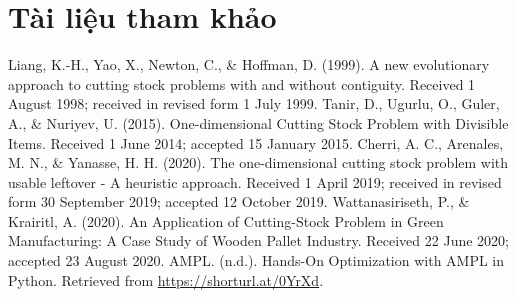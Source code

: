 \documentclass[a4paper]{article}
\begin{document}
\section{Tài liệu tham khảo}
\begin{center}
    \begin{thebibliography}{99}        
        Liang, K.-H., Yao, X., Newton, C., \& Hoffman, D. (1999). A new evolutionary approach to cutting stock problems with and without contiguity. Received 1 August 1998; received in revised form 1 July 1999.
        Tanir, D., Ugurlu, O., Guler, A., \& Nuriyev, U. (2015). One-dimensional Cutting Stock Problem with Divisible Items. Received 1 June 2014; accepted 15 January 2015.   
        Cherri, A. C., Arenales, M. N., \& Yanasse, H. H. (2020). The one-dimensional cutting stock problem with usable leftover - A heuristic approach. Received 1 April 2019; received in revised form 30 September 2019; accepted 12 October 2019.
        Wattanasiriseth, P., \& Krairitl, A. (2020). An Application of Cutting-Stock Problem in Green Manufacturing: A Case Study of Wooden Pallet Industry. Received 22 June 2020; accepted 23 August 2020.
        AMPL. (n.d.). Hands-On Optimization with AMPL in Python. Retrieved from \url{https://shorturl.at/0YrXd}.
            
        
    \end{thebibliography}
\end{center}


\pagebreak
\nocite{*}
\printbibliography[
heading=bibintoc,
title={References}
]
\end{document}

